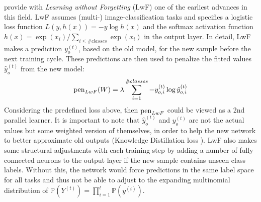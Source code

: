 \citeauthor{li2017learningforgetting} \cite{li2017learningforgetting} provide with \textit{Learning without Forgetting} (LwF) one of the earliest advances in this field. LwF assumes (multi-) image-classification tasks and specifies a logistic loss function $L(y, h(x)) = -y \log h(x)$ and the softmax activation function $h(x) = \exp(x_i)/\sum_{i\leq \#classes}\exp(x_i)$ in the output layer. In detail, LwF makes a prediction $y_o^{(t)}$, based on the old model, for the new sample before the next training cycle. These predictions are then used to penalize the fitted values $\hat{y}_o^{(t)}$ from the new model:
\begin{equation}\label{LwF}
	\operatorname{pen}_{LwF}(W) = \lambda \sum_{i = 1}^{\#classes}-y_{o,i}^{(t)} \log \hat{y}_{o,i}^{(t)}
\end{equation}
Considering the predefined loss above, then $\operatorname{pen}_{LwF}$ could be viewed as a 2nd parallel learner. It is important to note that $\hat{y}_o^{(t)}$ and $y_o^{(t)}$ are not the actual values but some weighted version of themselves, in order to help the new network to better approximate old outputs (Knowledge Distillation loss \cite{hinton2015distillingknowledgeneuralnetwork}). LwF also makes some structural adjustments with each training step by adding a number of fully connected neurons to the output layer if the new sample contains unseen class labels. Without this, the network would force predictions in the same label space for all tasks and thus not be able to adjust to the expanding multinomial distribution of $\mathbb{P}(Y^{(t)}) = \prod_{i = 1}^{t}\mathbb{P}(y^{(i)})$.

